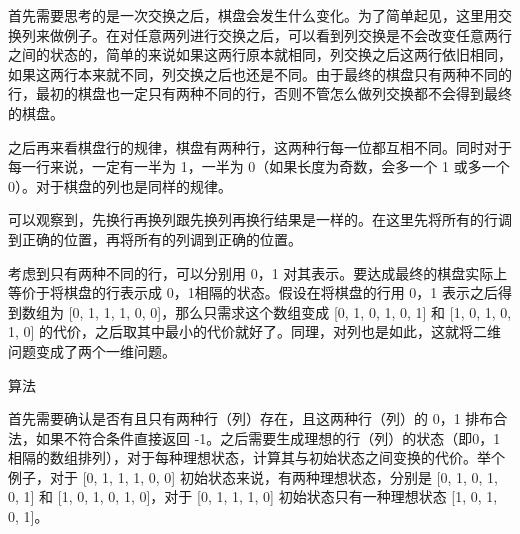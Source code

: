 \documentclass[9pt, b5paaper]{book}
\begin{document}
首先需要思考的是一次交换之后，棋盘会发生什么变化。为了简单起见，这里用交换列来做例子。在对任意两列进行交换之后，可以看到列交换是不会改变任意两行之间的状态的，简单的来说如果这两行原本就相同，列交换之后这两行依旧相同，如果这两行本来就不同，列交换之后也还是不同。由于最终的棋盘只有两种不同的行，最初的棋盘也一定只有两种不同的行，否则不管怎么做列交换都不会得到最终的棋盘。

之后再来看棋盘行的规律，棋盘有两种行，这两种行每一位都互相不同。同时对于每一行来说，一定有一半为 1，一半为 0（如果长度为奇数，会多一个 1 或多一个 0）。对于棋盘的列也是同样的规律。

可以观察到，先换行再换列跟先换列再换行结果是一样的。在这里先将所有的行调到正确的位置，再将所有的列调到正确的位置。

考虑到只有两种不同的行，可以分别用 0，1 对其表示。要达成最终的棋盘实际上等价于将棋盘的行表示成 0，1相隔的状态。假设在将棋盘的行用 0，1 表示之后得到数组为 [0, 1, 1, 1, 0, 0]，那么只需求这个数组变成 [0, 1, 0, 1, 0, 1] 和 [1, 0, 1, 0, 1, 0] 的代价，之后取其中最小的代价就好了。同理，对列也是如此，这就将二维问题变成了两个一维问题。

算法

首先需要确认是否有且只有两种行（列）存在，且这两种行（列）的 0，1 排布合法，如果不符合条件直接返回 -1。之后需要生成理想的行（列）的状态（即0，1相隔的数组排列），对于每种理想状态，计算其与初始状态之间变换的代价。举个例子，对于 [0, 1, 1, 1, 0, 0] 初始状态来说，有两种理想状态，分别是 [0, 1, 0, 1, 0, 1] 和 [1, 0, 1, 0, 1, 0]，对于 [0, 1, 1, 1, 0] 初始状态只有一种理想状态 [1, 0, 1, 0, 1]。
\end{document}
